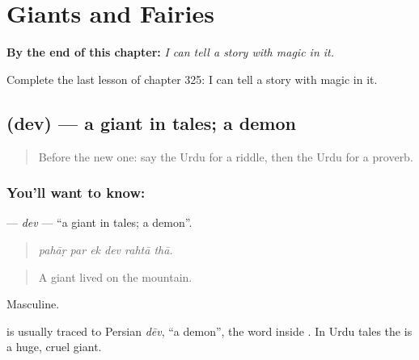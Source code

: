 
\chapter{Giants and Fairies}
\label{ch:ur-giants-and-fairies}

\begin{chapteropening}
\textbf{By the end of this chapter:} \emph{I can tell a story with magic in it.}

Complete the last lesson of chapter 325: I can tell a story with magic in it.
\end{chapteropening}

\section[\texorpdfstring{\ur{دیو} (dev)}{دیو (dev)}]{ (dev) — a giant in tales; a demon}

\label{lesson:UR-C325-dev}



\begin{quote}
Before the new one: say the Urdu for a riddle, then the Urdu for a proverb.
\end{quote}

\subsection*{You'll want to know: }
\textbf{} — \emph{dev} — \textquotedblleft{}a giant in tales; a demon\textquotedblright{}.

\begin{quote}
     
\end{quote}

\begin{quote}
\emph{pahāṛ par ek dev rahtā thā.}
\end{quote}

\begin{quote}
A giant lived on the mountain.
\end{quote}

Masculine.

\begin{cousinweb}
is usually traced to Persian \emph{dēv}, \textquotedblleft{}a demon\textquotedblright{}, the word inside \textbf{}. In Urdu tales the \textbf{} is a huge, cruel giant.
\end{cousinweb}

